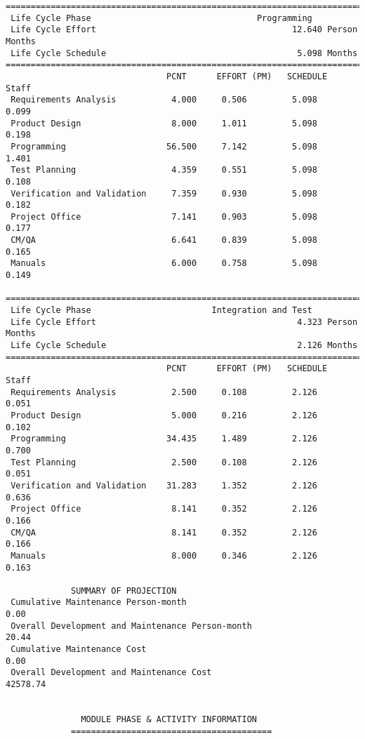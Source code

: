 \documentclass[11pt,a4paper,spanish,twoside]{report}
\begin{document}
{\begin{verbatim}
==============================================================================
 Life Cycle Phase                                 Programming
 Life Cycle Effort                                       12.640 Person Months
 Life Cycle Schedule                                      5.098 Months
==============================================================================
                                PCNT      EFFORT (PM)   SCHEDULE       Staff   
 Requirements Analysis           4.000     0.506         5.098        0.099
 Product Design                  8.000     1.011         5.098        0.198
 Programming                    56.500     7.142         5.098        1.401
 Test Planning                   4.359     0.551         5.098        0.108
 Verification and Validation     7.359     0.930         5.098        0.182
 Project Office                  7.141     0.903         5.098        0.177
 CM/QA                           6.641     0.839         5.098        0.165
 Manuals                         6.000     0.758         5.098        0.149

==============================================================================
 Life Cycle Phase                        Integration and Test
 Life Cycle Effort                                        4.323 Person Months
 Life Cycle Schedule                                      2.126 Months
==============================================================================
                                PCNT      EFFORT (PM)   SCHEDULE       Staff   
 Requirements Analysis           2.500     0.108         2.126        0.051
 Product Design                  5.000     0.216         2.126        0.102
 Programming                    34.435     1.489         2.126        0.700
 Test Planning                   2.500     0.108         2.126        0.051
 Verification and Validation    31.283     1.352         2.126        0.636
 Project Office                  8.141     0.352         2.126        0.166
 CM/QA                           8.141     0.352         2.126        0.166
 Manuals                         8.000     0.346         2.126        0.163

             SUMMARY OF PROJECTION
 Cumulative Maintenance Person-month                                 0.00
 Overall Development and Maintenance Person-month                   20.44
 Cumulative Maintenance Cost                                         0.00
 Overall Development and Maintenance Cost                        42578.74


		       MODULE PHASE & ACTIVITY INFORMATION
		     ========================================


\end{verbatim}}
\end{document}
